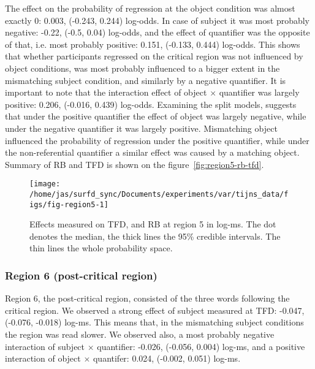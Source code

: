 The effect on the probability of regression at the object condition was
almost exactly 0: 0.003, (-0.243, 0.244) log-odds. In case of subject it was most probably negative: -0.22, (-0.5, 0.04) log-odds, and the effect of quantifier was the opposite of that, i.e. most probably positive: 0.151, (-0.133, 0.444) log-odds. This shows that whether participants regressed on the critical region was not influenced by object conditions, was most probably influenced to a bigger extent in the mismatching subject condition, and similarly by a negative quantifier.
It is important to note that the interaction effect of object $\times$ quantifier was largely positive: 0.206, (-0.016, 0.439) log-odds. Examining the split models, suggests that under the positive quantifier the effect of object was largely negative, while under the negative quantifier it was largely positive. Mismatching object influenced the probability of regression under the positive quantifier, while under the non-referential quantifier a similar effect was caused by a matching object.
Summary of RB and TFD is shown on the figure~\ref{fig:region5-rb-tfd}.

\begin{knitrout}
\color{fgcolor}\begin{figure}
\texttt{[image: /home/jas/surfd\_sync/Documents/experiments/var/tijns\_data/figs/fig-region5-1]} \caption{\label{fig:region5-rb-tfd}Effects measured on TFD, and RB at region 5 in log-ms. The dot denotes the median, the thick lines the 95\% credible intervals. The thin lines the whole probability space.}\label{fig:fig-region5}
\end{figure}

\end{knitrout}



\subsubsection{Region 6 (post-critical region)}

Region 6, the post-critical region, consisted of the three words following the critical region.
We observed a strong effect of subject measured at TFD: -0.047, (-0.076, -0.018) log-ms. This means that, in the mismatching subject conditions the region was read slower. We observed also, a most probably negative interaction of subject $\times$ quantifier: -0.026, (-0.056, 0.004) log-ms, and a positive interaction of object $\times$ quantifer: 0.024, (-0.002, 0.051) log-ms.

